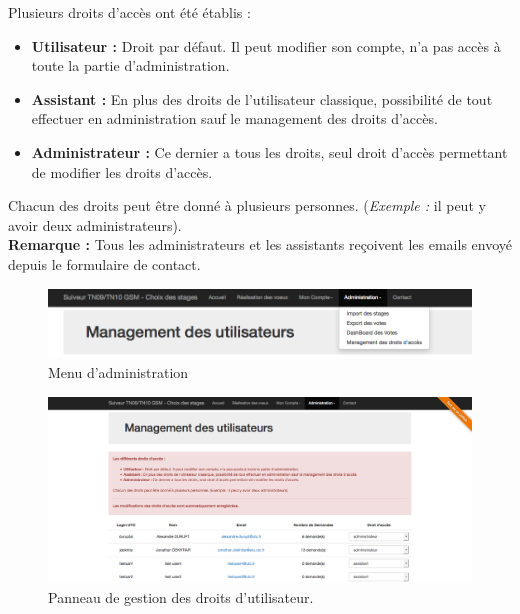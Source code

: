 \documentclass[a4paper,titlepage]{scrartcl}
\begin{document}
Plusieurs droits d'accès ont été établis : \\

\begin{itemize}
	\item \textbf{Utilisateur :} Droit par défaut. Il peut modifier son compte, n'a pas accès à toute la partie d'administration.\\
	
	\item  \textbf{Assistant :} En plus des droits de l'utilisateur classique, possibilité de tout effectuer en administration sauf le management des droits d'accès.\\
	
	\item \textbf{Administrateur :} Ce dernier a tous les droits, seul droit d'accès permettant de modifier les droits d'accès.\\
	
	
\end{itemize}

Chacun des droits peut être donné à plusieurs personnes. (\textit{Exemple :} il peut y avoir deux administrateurs).\\

\textbf{Remarque : }Tous les administrateurs et les assistants reçoivent les emails envoyé depuis le formulaire de contact.\\

\begin{figure}[H]
	\vspace{-3mm}
	\begin{center}
		\includegraphics[scale=0.47]{Images/admin_menu.png}
		\caption{Menu d'administration}
	\end{center}
\end{figure}


\begin{figure}[H]
	\vspace{-3mm}
	\begin{center}
		\includegraphics[scale=0.33]{Images/rights_management.png}
		\caption{Panneau de gestion des droits d'utilisateur.}
		\vspace{-2cm}
	\end{center}
\end{figure}
\end{document}
